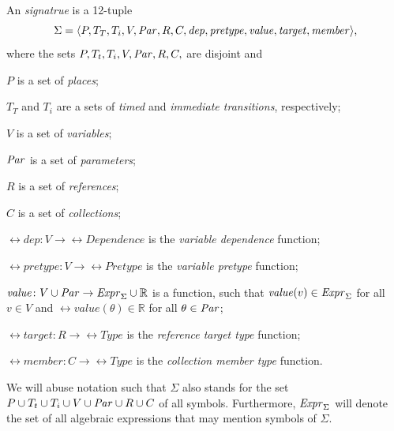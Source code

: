 \begin{dfn}\label{dfn:rgspn:rgspn}
  An \emph{ signatrue} is a 12-tuple
  \begin{equation}
    \Sigma = \langle P, T_T, T_i, V, \textrm{\itshape Par\/}, R, C, \textrm{\itshape dep\/}, \textrm{\itshape pretype\/}, \textrm{\itshape value\/}, \textrm{\itshape target\/}, \textrm{\itshape member\/}\rangle \text,
  \end{equation}
  where the sets \(P, T_t, T_i, V, \textrm{\itshape Par\/}, R, C,\) are disjoint and
  \begin{compactitem}
  \item \(P\) is a set of \emph{places};
  \item \(T_T\) and \(T_i\) are a sets of \emph{timed} and \emph{immediate transitions}, respectively;
  \item \(V\) is a set of \emph{variables};
  \item \(\textrm{\itshape Par\/}\) is a set of \emph{parameters};
  \item \(R\) is a set of \emph{references};
  \item \(C\) is a set of \emph{collections};
  \item \(\rel{dep}\colon V \to \rel{Dependence}\) is the \emph{variable dependence} function;
  \item \(\rel{pretype}\colon V \to \rel{Pretype}\) is the \emph{variable pretype} function;
  \item \(\textrm{\itshape value\/}\colon V \cup \textrm{\itshape Par\/} \to \textrm{\itshape Expr\/}_\Sigma \cup \mathbb{R}\) is a function, such that \(\textrm{\itshape value\/}(v) \in \textrm{\itshape Expr\/}_\Sigma\) for all \(v \in V\) and \(\rel{value}(\theta) \in \mathbb{R}\) for all \(\theta \in \textrm{\itshape Par\/}\);
  \item \(\rel{target}\colon R \to \rel{Type}\) is the \emph{reference target type} function;
  \item \(\rel{member}\colon C \to \rel{Type}\) is the \emph{collection member type} function.
  \end{compactitem}
\end{dfn}

We will abuse notation such that \(\Sigma\) also stands for the set \(P \cup T_t \cup T_i \cup V \cup \textrm{\itshape Par\/} \cup R \cup C\) of all symbols. Furthermore, \(\textrm{\itshape Expr\/}_\Sigma\) will denote the set of all algebraic expressions that may mention symbols of \(\Sigma\).

